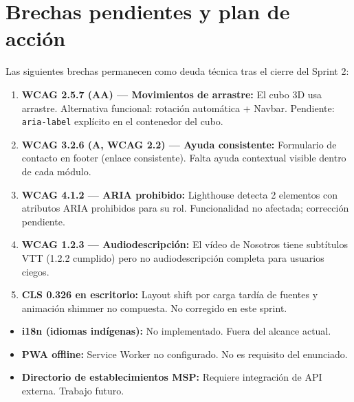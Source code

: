 \documentclass[12pt, a4paper]{article}
\begin{document}
\section{Brechas pendientes y plan de acción}

\begin{warnbox}
Las siguientes brechas permanecen como deuda técnica tras el cierre del Sprint 2:
\begin{enumerate}
  \item \textbf{WCAG 2.5.7 (AA) --- Movimientos de arrastre:} El cubo 3D usa arrastre. Alternativa funcional: rotación automática + Navbar. Pendiente: \texttt{aria-label} explícito en el contenedor del cubo.
  \item \textbf{WCAG 3.2.6 (A, WCAG 2.2) --- Ayuda consistente:} Formulario de contacto en footer (enlace consistente). Falta ayuda contextual visible dentro de cada módulo.
  \item \textbf{WCAG 4.1.2 --- ARIA prohibido:} Lighthouse detecta 2 elementos con atributos ARIA prohibidos para su rol. Funcionalidad no afectada; corrección pendiente.
  \item \textbf{WCAG 1.2.3 --- Audiodescripción:} El vídeo de Nosotros tiene subtítulos VTT (1.2.2 cumplido) pero no audiodescripción completa para usuarios ciegos.
  \item \textbf{CLS 0.326 en escritorio:} Layout shift por carga tardía de fuentes y animación shimmer no compuesta. No corregido en este sprint.
\end{enumerate}
\end{warnbox}

\begin{infobox}
\begin{itemize}
  \item \textbf{i18n (idiomas indígenas):} No implementado. Fuera del alcance actual.
  \item \textbf{PWA offline:} Service Worker no configurado. No es requisito del enunciado.
  \item \textbf{Directorio de establecimientos MSP:} Requiere integración de API externa. Trabajo futuro.
\end{itemize}
\end{infobox}
\end{document}
